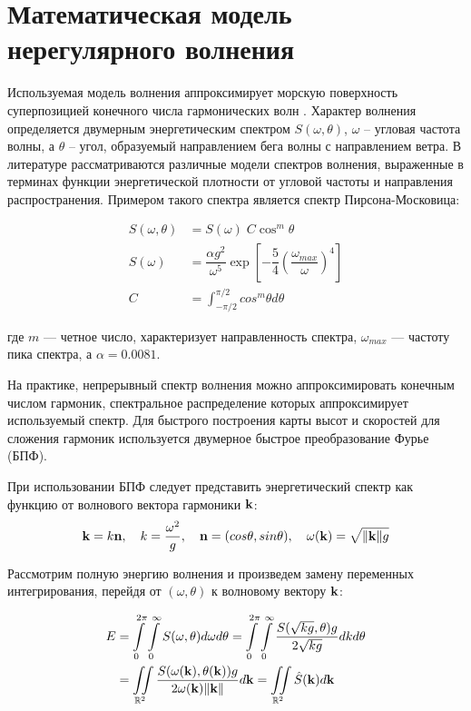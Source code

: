 \section{Математическая модель нерегулярного волнения}

Используемая модель волнения аппроксимирует морскую поверхность суперпозицией конечного числа гармонических волн \citep{lopatuhin2004}. Характер волнения определяется двумерным энергетическим спектром $S(\omega, \theta)$, $\omega$ -- угловая частота волны, а $\theta$ -- угол, образуемый направлением бега волны с направлением ветра. В литературе \citep{lopatuhin2004} рассматриваются различные модели спектров волнения, выраженные в терминах функции энергетической плотности от угловой частоты и направления распространения. Примером такого спектра является спектр Пирсона-Московица:

\begin{equation}
	\begin{split}
	S(\omega, \theta) &= S(\omega) \; C \cos^m\theta \\
	S(\omega) &= \dfrac{\alpha g^2}{\omega^5} \exp \left[ 
	  -\dfrac{5}{4} \left( \dfrac{\omega_{max}}{\omega} \right)^{4} 
	\right]  \\
	C &= \int_{-\pi/2}^{\pi/2} cos^m\theta d\theta
	\end{split}
\end{equation}

где $m$ --- четное число, характеризует направленность спектра, $\omega_{max}$ --- частоту пика спектра, а $\alpha = 0.0081$.

На практике, непрерывный спектр волнения можно аппроксимировать конечным числом гармоник, спектральное распределение которых аппроксимирует используемый спектр. Для быстрого построения карты высот и скоростей для сложения гармоник используется двумерное быстрое преобразование Фурье (БПФ).
 
При использовании БПФ следует представить энергетический спектр как функцию от волнового вектора гармоники $\mathbf{k}$:
$$ \mathbf{k} = k\mathbf{n},\quad 
k = \frac{\omega^2}{g} ,\quad 
\mathbf{n}=(cos \theta, sin \theta), \quad 
\omega(\mathbf{k}) = \sqrt{\lVert \mathbf{k} \rVert g} $$

Рассмотрим полную энергию волнения и произведем замену переменных интегрирования, перейдя от $(\omega, \theta)$ к волновому вектору $\mathbf{k}$:

\begin{equation}
	\begin{split}
	E &= \int\limits_0^{2\pi}
		 \int\limits_0^\infty S(\omega, \theta) d\omega d\theta
	  = \int\limits_0^{2\pi}
		 \int\limits_0^\infty 
			 \frac {S(\sqrt{kg}, \theta)g} {2\sqrt{kg}} dk d\theta\\
	  &= \iint\limits_{\mathbb{R}^2}
			 \frac{S(\omega(\mathbf{k}), \theta(\mathbf{k})) g}
				  {2\omega(\mathbf{k}) \lVert \mathbf{k} \rVert} d\mathbf{k}
	  = \iint\limits_{\mathbb{R}^2} \hat{S}(\mathbf{k})d\mathbf{k}
	\end{split}
\end{equation}

